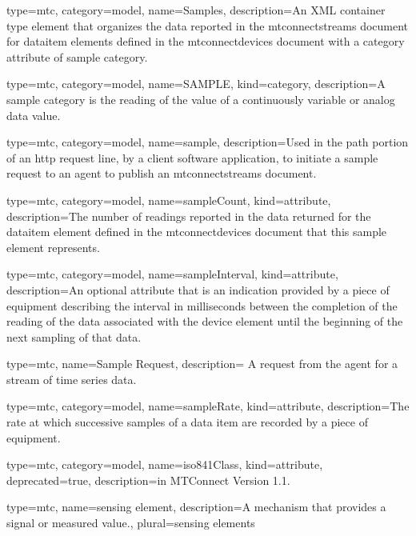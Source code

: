 {
  type=mtc,
  category=model,
  name={Samples},
  description={An XML container type element that organizes the data reported in the \glspl{mtconnectstream} document for \gls{dataitem} elements defined in the \glspl{mtconnectdevice} document with a \gls{category} attribute of \gls{sample category}.}
}


{
  type=mtc,
  category=model,
  name={SAMPLE},
  kind={category},
  description={A \gls{sample category} is the reading of the value of a continuously variable or analog data value.}
}


{
  type=mtc,
  category=model,
  name={sample},
  description={Used in the path portion of an \gls{http request line}, by a client software application, to initiate a \gls{sample request} to an \gls{agent} to publish an \glspl{mtconnectstream} document.}
}


{
  type=mtc,
  category=model,
  name={sampleCount},
  kind={attribute},
  description={The number of readings reported in the data returned for the \gls{dataitem} element defined in the \glspl{mtconnectdevice} document that this \gls{sample} element represents.}
}


{
  type=mtc,
  category=model,
  name={sampleInterval},
  kind={attribute},
  description={An optional attribute that is an indication provided by a piece of equipment describing the interval in milliseconds between the completion of the reading of the data associated with the \gls{device} element until the beginning of the next sampling of that data.}
}


{
  type=mtc,
  name={Sample Request},
  description= {A request from the \gls{agent} for a stream of time series data.}
}


{
  type=mtc,
  category=model,
  name={sampleRate},
  kind={attribute},
  description={The rate at which successive samples of a data item are recorded by a piece of equipment.}
}

{
  type=mtc,
  category=model,
  name={iso841Class},
  kind={attribute},
  deprecated={true},
  description={\DEPRECATED in MTConnect Version 1.1.}
}


{
  type=mtc,
  name={sensing element},
  description={A mechanism that provides a signal or measured value.},
  plural={sensing elements}
}


